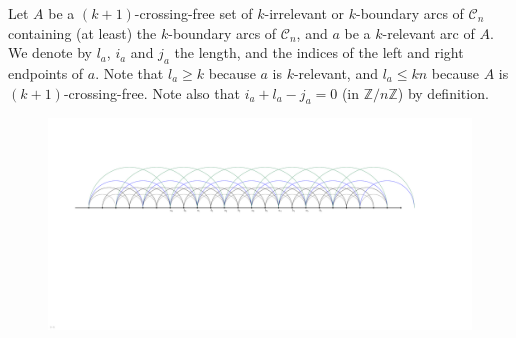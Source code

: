 \documentclass{amsart}
\theoremstyle{remark}
\newcommand{\Z}{\mathbb{Z}} %
\newcommand{\cylinder}{\mathcal{C}}
\begin{document}
Let $A$ be a $(k+1)$-crossing-free set of $k$-irrelevant or $k$-boundary arcs of $\cylinder_n$ containing (at least) the $k$-boundary arcs of $\cylinder_n$, and $a$ be a $k$-relevant arc of $A$. We denote by $l_a$, $i_a$ and $j_a$ the length, and the indices of the left and right endpoints of $a$. Note that $l_a \ge k$ because $a$ is $k$-relevant, and $l_a \le kn$ because $A$ is $(k+1)$-crossing-free. Note also that $i_a+l_a-j_a=0$ (in $\Z/n\Z$) by definition.

\begin{figure}[b]
	\capstart
	\mbox{\includegraphics[page=6, scale=.5, clip, trim=21.2cm 0cm 24cm 6cm]{FNSk3p2} \quad {}} \\[.5cm]

\end{figure}
\end{document}

